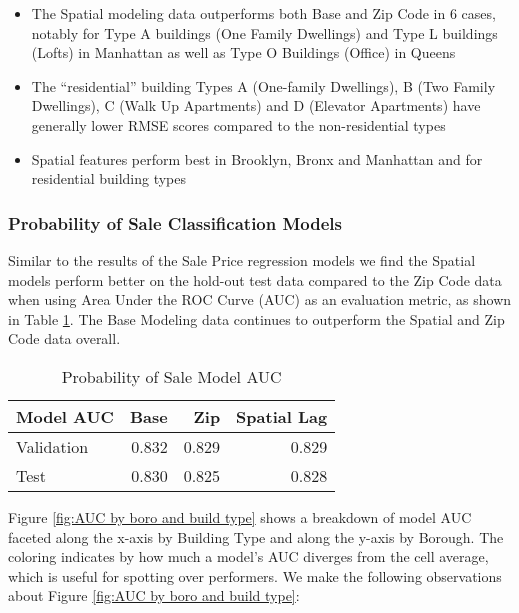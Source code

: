 \documentclass[12pt,]{article}
\providecommand{\tightlist}{%
  \setlength{\itemsep}{0pt}\setlength{\parskip}{0pt}}
\begin{document}
\begin{itemize}
\tightlist
\item
  The Spatial modeling data outperforms both Base and Zip Code in 6
  cases, notably for Type A buildings (One Family Dwellings) and Type L
  buildings (Lofts) in Manhattan as well as Type O Buildings (Office) in
  Queens
\item
  The ``residential'' building Types A (One-family Dwellings), B (Two
  Family Dwellings), C (Walk Up Apartments) and D (Elevator Apartments)
  have generally lower RMSE scores compared to the non-residential types
\item
  Spatial features perform best in Brooklyn, Bronx and Manhattan and for
  residential building types
\end{itemize}

\hypertarget{probability-of-sale-classification-models}{%
\subsubsection{Probability of Sale Classification
Models}\label{probability-of-sale-classification-models}}

Similar to the results of the Sale Price regression models we find the
Spatial models perform better on the hold-out test data compared to the
Zip Code data when using Area Under the ROC Curve (AUC) as an evaluation
metric, as shown in Table \ref{tab:ProbSaleModelAUC}. The Base Modeling
data continues to outperform the Spatial and Zip Code data overall.

\begin{table}

\caption{\label{tab:Prob Model AUC}\label{tab:ProbSaleModelAUC} Probability of Sale Model AUC}
\centering
\begin{tabular}[t]{lrrr}
\toprule
Model AUC & Base & Zip & Spatial Lag\\
\midrule
Validation & 0.832 & 0.829 & 0.829\\
Test & 0.830 & 0.825 & 0.828\\
\bottomrule
\end{tabular}
\end{table}

Figure \ref{fig:AUC by boro and build type} shows a breakdown of model
AUC faceted along the x-axis by Building Type and along the y-axis by
Borough. The coloring indicates by how much a model's AUC diverges from
the cell average, which is useful for spotting over performers. We make
the following observations about Figure
\ref{fig:AUC by boro and build type}:
\end{document}
